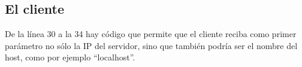 \subsection{El cliente}


De la línea 30 a la 34 hay código que permite que el cliente reciba
como primer parámetro no sólo la IP del servidor, sino que también podría
ser el nombre del host, como por ejemplo ``localhost''.

